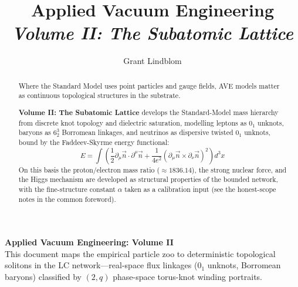 \title{\textbf{Applied Vacuum Engineering} \\ \large \textit{Volume II: The Subatomic Lattice}}
\author{Grant Lindblom}
\date{}

\maketitle

\vfill
\noindent\textbf{Applied Vacuum Engineering: Volume II} \\
This document maps the empirical particle zoo to deterministic topological solitons in the LC network---real-space flux linkages ($0_1$ unknots, Borromean baryons) classified by $(2,q)$ phase-space torus-knot winding portraits.

\begin{abstract}
    Where the Standard Model uses point particles and gauge fields, AVE models matter as continuous topological structures in the substrate.
    
    \textbf{Volume II: The Subatomic Lattice} develops the Standard-Model mass hierarchy from discrete knot topology and dielectric saturation, modelling leptons as $0_1$ unknots, baryons as $6^3_2$ Borromean linkages, and neutrinos as dispersive twisted $0_1$ unknots, bound by the Faddeev-Skyrme energy functional:
    \begin{equation}
        E = \int \left( \frac{1}{2}\partial_\mu \vec{n} \cdot \partial^\mu \vec{n} + \frac{1}{4e^2}(\partial_\mu \vec{n} \times \partial_\nu \vec{n})^2 \right) d^3x
    \end{equation}
    On this basis the proton/electron mass ratio ($\approx 1836.14$), the strong nuclear force, and the Higgs mechanism are developed as structural properties of the bounded network, with the fine-structure constant $\alpha$ taken as a calibration input (see the honest-scope notes in the common foreword).
\end{abstract}
